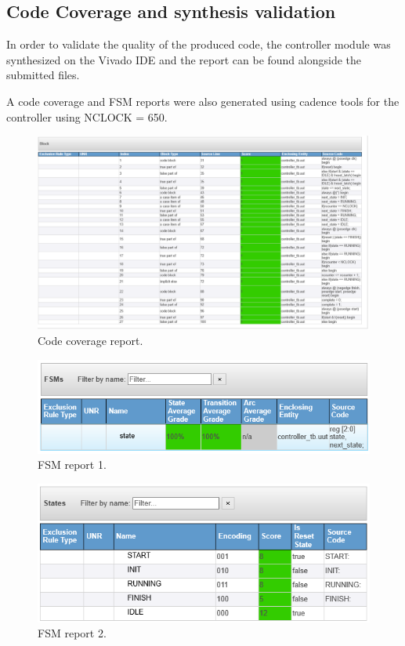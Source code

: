 \documentclass[12pt]{article}
\begin{document}
	
    \subsection*{Code Coverage and synthesis validation}
    In order to validate the quality of the produced code, the controller module was synthesized on the Vivado IDE and the report can be found alongside the submitted files.
    
    A code coverage and FSM reports were also generated using cadence tools for the controller using NCLOCK = 650.
    \begin{figure}[H]
        \centering
        \includegraphics[scale=0.4]{codecoverage.png}
            \caption{Code coverage report.}
            \label{fig:CodeCoverageReport}
    \end{figure}
    \begin{figure}[H]
        \centering
        \includegraphics[scale=0.7]{FSM_report1.png}
            \caption{FSM report 1.}
            \label{fig:FSMreport1}
    \end{figure}
    \begin{figure}[H]
        \centering
        \includegraphics[scale=0.7]{FSM_report2.png}
            \caption{FSM report 2.}
            \label{fig:FSMreport2}
    \end{figure}
\end{document}
